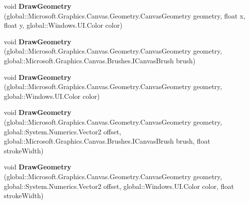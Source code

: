 \begin{DoxyCompactItemize}
\item 
\mbox{\label{interface_microsoft_1_1_graphics_1_1_canvas_1_1_i_canvas_drawing_session_a190e369f48e7cc85937b9479a6f482e2}} 
void {\bfseries Draw\+Geometry} (global\+::\+Microsoft.\+Graphics.\+Canvas.\+Geometry.\+Canvas\+Geometry geometry, float x, float y, global\+::\+Windows.\+U\+I.\+Color color)
\item 
\mbox{\label{interface_microsoft_1_1_graphics_1_1_canvas_1_1_i_canvas_drawing_session_ac78574a29e5abb844e4ce42a12bc3c4f}} 
void {\bfseries Draw\+Geometry} (global\+::\+Microsoft.\+Graphics.\+Canvas.\+Geometry.\+Canvas\+Geometry geometry, global\+::\+Microsoft.\+Graphics.\+Canvas.\+Brushes.\+I\+Canvas\+Brush brush)
\item 
\mbox{\label{interface_microsoft_1_1_graphics_1_1_canvas_1_1_i_canvas_drawing_session_ac5b9f0631a824d82558c4cd88f42bf6a}} 
void {\bfseries Draw\+Geometry} (global\+::\+Microsoft.\+Graphics.\+Canvas.\+Geometry.\+Canvas\+Geometry geometry, global\+::\+Windows.\+U\+I.\+Color color)
\item 
\mbox{\label{interface_microsoft_1_1_graphics_1_1_canvas_1_1_i_canvas_drawing_session_a9eb69f06c5b4a463ef75f0e98c94634e}} 
void {\bfseries Draw\+Geometry} (global\+::\+Microsoft.\+Graphics.\+Canvas.\+Geometry.\+Canvas\+Geometry geometry, global\+::\+System.\+Numerics.\+Vector2 offset, global\+::\+Microsoft.\+Graphics.\+Canvas.\+Brushes.\+I\+Canvas\+Brush brush, float stroke\+Width)
\item 
\mbox{\label{interface_microsoft_1_1_graphics_1_1_canvas_1_1_i_canvas_drawing_session_ac3f9cff646e59b7981fc11b3494504be}} 
void {\bfseries Draw\+Geometry} (global\+::\+Microsoft.\+Graphics.\+Canvas.\+Geometry.\+Canvas\+Geometry geometry, global\+::\+System.\+Numerics.\+Vector2 offset, global\+::\+Windows.\+U\+I.\+Color color, float stroke\+Width)
\item 
\mbox{\label{interface_microsoft_1_1_graphics_1_1_canvas_1_1_i_canvas_drawing_session_a13ed7fcb5522a18a9f6b2ab39420b568}} 

\end{DoxyCompactItemize}
